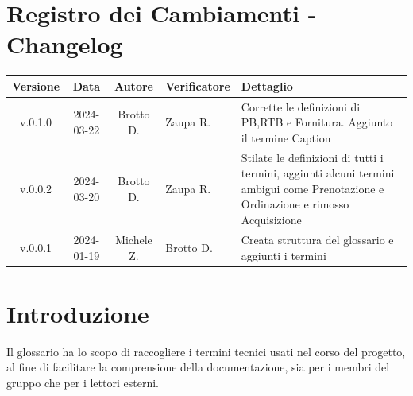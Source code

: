 \documentclass[12pt, oneside]{article}
\begin{document}
\section*{Registro dei Cambiamenti - Changelog}
\begin{tabular}{|c|c|c|p{3cm}|p{6cm}|}
  \hline
  \textbf{Versione} & \textbf{Data} & \textbf{Autore} & \textbf{Verificatore} & \textbf{Dettaglio}                                                                                                                \\
  \hline
  v.0.1.0           & 2024-03-22    & Brotto D.       & Zaupa R.              & Corrette le definizioni di PB,RTB e Fornitura. Aggiunto il termine Caption                                                        \\
  \hline
  v.0.0.2           & 2024-03-20    & Brotto D.       & Zaupa R.              & Stilate le definizioni di tutti i termini, aggiunti alcuni termini ambigui come Prenotazione e Ordinazione e rimosso Acquisizione \\
  \hline
  v.0.0.1           & 2024-01-19    & Michele Z.      & Brotto D.             & Creata struttura del glossario e aggiunti i termini                                                                               \\
  \hline
\end{tabular}
\newpage

\tableofcontents
\newpage
\section{Introduzione}
Il glossario ha lo scopo di raccogliere i termini tecnici usati nel corso del
progetto, al fine di facilitare la comprensione della documentazione, sia per i
membri del gruppo che per i lettori esterni. 
\newpage

\newpage

\newpage

\newpage

\newpage

\newpage

\newpage

\newpage

\newpage

\newpage

\newpage

\newpage

\newpage

\newpage

\newpage

\newpage

\newpage

\newpage

\newpage

\newpage

\newpage

\newpage

\newpage

\newpage

\newpage

\newpage

\end{document}
